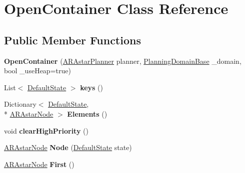 \hypertarget{class_open_container}{\section{Open\-Container Class Reference}
\label{class_open_container}
}
\subsection*{Public Member Functions}
\begin{DoxyCompactItemize}
\item 
\hypertarget{class_open_container_a8fe6042f8f2b6e023c0ccbeb302c3145}{{\bfseries Open\-Container} (\hyperlink{class_a_r_astar_planner}{A\-R\-Astar\-Planner} planner, \hyperlink{class_planning_domain_base}{Planning\-Domain\-Base} \-\_\-domain, bool \-\_\-use\-Heap=true)}\label{class_open_container_a8fe6042f8f2b6e023c0ccbeb302c3145}

\item 
\hypertarget{class_open_container_a9c2ac72d426256bd0f038b7375fb184e}{List$<$ \hyperlink{class_default_state}{Default\-State} $>$ {\bfseries keys} ()}\label{class_open_container_a9c2ac72d426256bd0f038b7375fb184e}

\item 
\hypertarget{class_open_container_ab7eb3e91880b999b099b54c4325dcec9}{Dictionary$<$ \hyperlink{class_default_state}{Default\-State}, \\*
\hyperlink{class_a_r_astar_node}{A\-R\-Astar\-Node} $>$ {\bfseries Elements} ()}\label{class_open_container_ab7eb3e91880b999b099b54c4325dcec9}

\item 
\hypertarget{class_open_container_a9f4b0b441dba986b7bf15d9359eb6900}{void {\bfseries clear\-High\-Priority} ()}\label{class_open_container_a9f4b0b441dba986b7bf15d9359eb6900}

\item 
\hypertarget{class_open_container_ad8c27e3618b6988966c38fe76cc87e65}{\hyperlink{class_a_r_astar_node}{A\-R\-Astar\-Node} {\bfseries Node} (\hyperlink{class_default_state}{Default\-State} state)}\label{class_open_container_ad8c27e3618b6988966c38fe76cc87e65}

\item 
\hypertarget{class_open_container_a19e53059762a7f0aa5bb5a96fe31506d}{\hyperlink{class_a_r_astar_node}{A\-R\-Astar\-Node} {\bfseries First} ()}\label{class_open_container_a19e53059762a7f0aa5bb5a96fe31506d}


\end{DoxyCompactItemize}
